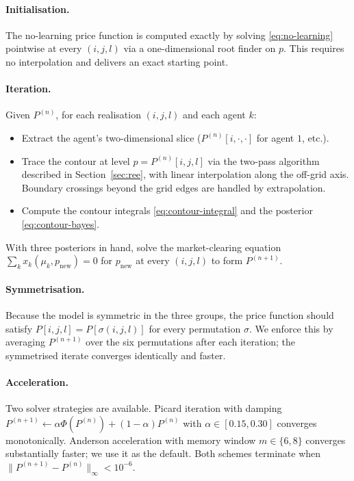 \documentclass[12pt,letterpaper]{article}
\theoremstyle{definition}
\theoremstyle{remark}
\newcommand{\1}{\mathbf{1}}
\begin{document}
\paragraph{Initialisation.} The no-learning price function is computed
exactly by solving \eqref{eq:no-learning} pointwise at every $(i,j,l)$ via
a one-dimensional root finder on $p$. This requires no interpolation and
delivers an exact starting point.

\paragraph{Iteration.} Given $P^{(n)}$, for each realisation $(i,j,l)$ and
each agent $k$:
\begin{itemize}[topsep=2pt,itemsep=2pt]
   \item Extract the agent's two-dimensional slice
         ($P^{(n)}[i,\cdot,\cdot]$ for agent $1$, etc.).
   \item Trace the contour at level $p=P^{(n)}[i,j,l]$ via the two-pass
         algorithm described in Section~\ref{sec:ree}, with linear
         interpolation along the off-grid axis. Boundary crossings beyond
         the grid edges are handled by extrapolation.
   \item Compute the contour integrals \eqref{eq:contour-integral} and
         the posterior \eqref{eq:contour-bayes}.
\end{itemize}
With three posteriors in hand, solve the market-clearing equation
$\sum_{k}x_{k}(\mu_{k},p_{\text{new}})=0$ for $p_{\text{new}}$ at every
$(i,j,l)$ to form $P^{(n+1)}$.

\paragraph{Symmetrisation.} Because the model is symmetric in the three
groups, the price function should satisfy $P[i,j,l]=P[\sigma(i,j,l)]$ for
every permutation $\sigma$. We enforce this by averaging $P^{(n+1)}$ over
the six permutations after each iteration; the symmetrised iterate
converges identically and faster.

\paragraph{Acceleration.} Two solver strategies are available. Picard
iteration with damping
$P^{(n+1)}\leftarrow \alpha\Phi(P^{(n)})+(1-\alpha)P^{(n)}$ with
$\alpha\in[0.15,0.30]$ converges monotonically. Anderson acceleration with
memory window $m\in\{6,8\}$ converges substantially faster; we use it as
the default. Both schemes terminate when
$\|P^{(n+1)}-P^{(n)}\|_{\infty}<10^{-6}$.
\end{document}

